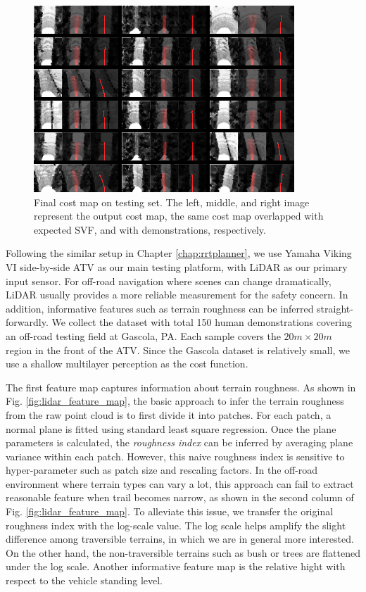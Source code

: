 \documentclass[../thesis.tex]{subfiles}
\begin{document}
\begin{figure}[t]
	\begin{center}
		\centerline{\includegraphics[width=0.8\columnwidth]{./DIRL/fig/gradtestImg040.png}}
		\caption{Final cost map on testing set. The left, middle, and right image represent the output cost map, the same cost map overlapped with expected SVF, and with demonstrations, respectively.}
		\label{fig:final_cost_map}
	\end{center}
\end{figure} 

Following the similar setup in Chapter \ref{chap:rrtplanner}, we use Yamaha Viking VI side-by-side ATV as our main testing platform, with LiDAR as our primary input sensor. 
For off-road navigation where scenes can change dramatically, LiDAR usually provides a more reliable measurement for the safety concern.
In addition, informative features such as terrain roughness can be inferred straight-forwardly.
We collect the dataset with total 150 human demonstrations covering an off-road testing field at Gascola, PA. Each sample covers the $20m \times 20m$ region in the front of the ATV. Since the Gascola dataset is relatively small, we use a shallow multilayer perception as the cost function. 

The first feature map captures information about terrain roughness.
As shown in Fig. \ref{fig:lidar_feature_map}, the basic approach to infer the terrain roughness from the raw point cloud is to first divide it into patches. 
For each patch, a normal plane is fitted using standard least square regression. 
Once the plane parameters is calculated, the \textit{roughness index} can be inferred by averaging plane variance within each patch. 
However, this naive roughness index is sensitive to hyper-parameter such as patch size and rescaling factors. 
In the off-road environment where terrain types can vary a lot, this approach can fail to extract reasonable feature when trail becomes narrow, as shown in the second column of Fig. \ref{fig:lidar_feature_map}. 
To alleviate this issue, we transfer the original roughness index with the log-scale value. 
The log scale helps amplify the slight difference among traversible terrains, in which we are in general more interested.
On the other hand, the non-traversible terrains such as bush or trees are flattened under the log scale. 
Another informative feature map is the relative hight with respect to the vehicle standing level. 
\end{document}
